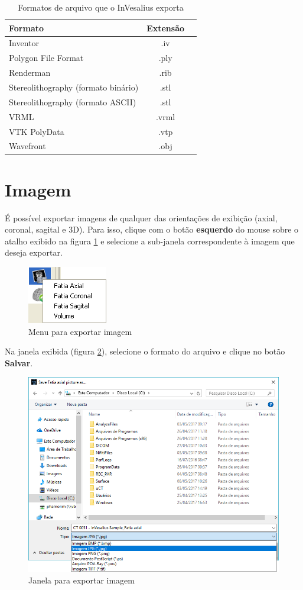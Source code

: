 \begin{table}[h]
\centering
\caption{Formatos de arquivo que o InVesalius exporta}
\begin{tabular}{lcc}\\
\hline %
Formato & Extensão\\
\hline
\hline
Inventor & .iv\\
Polygon File Format & .ply\\
Renderman & .rib\\
Stereolithography (formato binário)& .stl\\
Stereolithography (formato ASCII) & .stl\\
VRML & .vrml\\
VTK PolyData & .vtp\\
Wavefront & .obj\\
\hline
\end{tabular}
\label{tab:files_export_list}
\end{table} 


\section{Imagem}

É possível exportar imagens de qualquer das orientações de exibição (axial, coronal,
sagital e 3D). Para isso, clique com o botão \textbf{esquerdo} do mouse sobre o atalho
exibido na figura \ref{fig:menu_save_image_window} e selecione a sub-janela correspondente
à imagem que deseja exportar.

\begin{figure}[!htb]
\centering
\includegraphics[scale=0.5]{../user_guide_figures/invesalius_screen/menu_save_image_window_pt.png}
\caption{Menu para exportar imagem}
\label{fig:menu_save_image_window}
\end{figure}

Na janela exibida (figura \ref{fig:save_image_window}), selecione o formato do arquivo e
clique no botão \textbf{Salvar}.

\begin{figure}[!htb]
\centering
\includegraphics[scale=0.4]{../user_guide_figures/invesalius_screen/export_bmp_pt.png}
\caption{Janela para exportar imagem}
\label{fig:save_image_window}
\end{figure}
